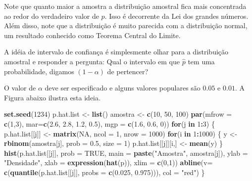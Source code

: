 \documentclass[10pt,a4paper]{book}
\newenvironment{Shaded}{\begin{snugshade}}{\end{snugshade}}
\newcommand{\KeywordTok}[1]{\textcolor[rgb]{0.13,0.29,0.53}{\textbf{#1}}}
\newcommand{\DataTypeTok}[1]{\textcolor[rgb]{0.13,0.29,0.53}{#1}}
\newcommand{\DecValTok}[1]{\textcolor[rgb]{0.00,0.00,0.81}{#1}}
\newcommand{\FloatTok}[1]{\textcolor[rgb]{0.00,0.00,0.81}{#1}}
\newcommand{\StringTok}[1]{\textcolor[rgb]{0.31,0.60,0.02}{#1}}
\newcommand{\OtherTok}[1]{\textcolor[rgb]{0.56,0.35,0.01}{#1}}
\newcommand{\ControlFlowTok}[1]{\textcolor[rgb]{0.13,0.29,0.53}{\textbf{#1}}}
\newcommand{\OperatorTok}[1]{\textcolor[rgb]{0.81,0.36,0.00}{\textbf{#1}}}
\newcommand{\NormalTok}[1]{#1}
\begin{document}
Note que quanto maior a amostra a distribuição amostral fica mais
concentrada ao redor do verdadeiro valor de \(p\). Isso é decorrente da
Lei dos grandes números. Além disso, note que a distribuição é muito
parecida com a distribuição normal, um resultado conhecido como Teorema
Central do Limite.

A idéia de intervalo de confiança é simplesmente olhar para a
distribuição amostral e responder a pergunta: Qual o intervalo em que
\(\hat{p}\) tem uma probabilidade, digamos \((1-\alpha)\) de pertencer?

O valor de \(\alpha\) deve ser especificado e alguns valores populares
são \(0.05\) e \(0.01\). A Figura abaixo ilustra esta ideia.

\begin{Shaded}
\begin{Highlighting}[]
\KeywordTok{set.seed}\NormalTok{(}\DecValTok{1234}\NormalTok{)}
\NormalTok{p.hat.list <-}\StringTok{ }\KeywordTok{list}\NormalTok{()}
\NormalTok{amostra <-}\StringTok{ }\KeywordTok{c}\NormalTok{(}\DecValTok{10}\NormalTok{, }\DecValTok{50}\NormalTok{, }\DecValTok{100}\NormalTok{)}
\KeywordTok{par}\NormalTok{(}\DataTypeTok{mfrow =} \KeywordTok{c}\NormalTok{(}\DecValTok{1}\NormalTok{,}\DecValTok{3}\NormalTok{), }\DataTypeTok{mar=}\KeywordTok{c}\NormalTok{(}\FloatTok{2.6}\NormalTok{, }\FloatTok{2.8}\NormalTok{, }\FloatTok{1.2}\NormalTok{, }\FloatTok{0.5}\NormalTok{), }\DataTypeTok{mgp =} \KeywordTok{c}\NormalTok{(}\FloatTok{1.6}\NormalTok{, }\FloatTok{0.6}\NormalTok{, }\DecValTok{0}\NormalTok{))}
\ControlFlowTok{for}\NormalTok{(j }\ControlFlowTok{in} \DecValTok{1}\OperatorTok{:}\DecValTok{3}\NormalTok{) \{}
\NormalTok{  p.hat.list[[j]] <-}\StringTok{ }\KeywordTok{matrix}\NormalTok{(}\OtherTok{NA}\NormalTok{, }\DataTypeTok{ncol =} \DecValTok{1}\NormalTok{, }\DataTypeTok{nrow =} \DecValTok{1000}\NormalTok{)}
  \ControlFlowTok{for}\NormalTok{(i }\ControlFlowTok{in} \DecValTok{1}\OperatorTok{:}\DecValTok{1000}\NormalTok{) \{}
\NormalTok{  y <-}\StringTok{ }\KeywordTok{rbinom}\NormalTok{(amostra[j], }\DataTypeTok{prob =} \FloatTok{0.5}\NormalTok{, }\DataTypeTok{size =} \DecValTok{1}\NormalTok{)}
\NormalTok{  p.hat.list[[j]][i,] <-}\StringTok{ }\KeywordTok{mean}\NormalTok{(y)}
\NormalTok{  \}}
\KeywordTok{hist}\NormalTok{(p.hat.list[[j]], }\DataTypeTok{prob =} \OtherTok{TRUE}\NormalTok{, }\DataTypeTok{main =} \KeywordTok{paste}\NormalTok{(}\StringTok{"Amostra"}\NormalTok{, amostra[j]), }
     \DataTypeTok{ylab =} \StringTok{"Densidade"}\NormalTok{,}
     \DataTypeTok{xlab =} \KeywordTok{expression}\NormalTok{(}\KeywordTok{hat}\NormalTok{(p)), }\DataTypeTok{xlim =} \KeywordTok{c}\NormalTok{(}\DecValTok{0}\NormalTok{,}\DecValTok{1}\NormalTok{))}
\KeywordTok{abline}\NormalTok{(}\DataTypeTok{v=} \KeywordTok{c}\NormalTok{(}\KeywordTok{quantile}\NormalTok{(p.hat.list[[j]], }\DataTypeTok{probs =} \KeywordTok{c}\NormalTok{(}\FloatTok{0.025}\NormalTok{, }\FloatTok{0.975}\NormalTok{))), }\DataTypeTok{col =} \StringTok{"red"}\NormalTok{)}
\NormalTok{\}}
\end{Highlighting}
\end{Shaded}
\end{document}
